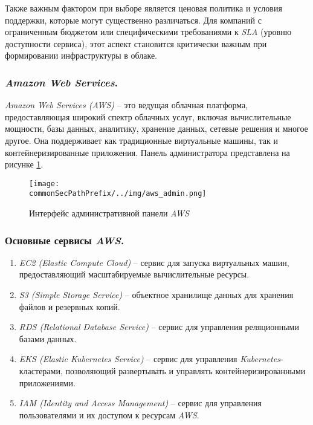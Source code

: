 Также важным фактором при выборе является ценовая политика и условия поддержки, которые могут существенно различаться. Для компаний с ограниченным бюджетом или специфическими требованиями к \textit{SLA} (уровню доступности сервиса), этот аспект становится критически важным при формировании инфраструктуры в облаке.

\subsubsection{\textit{Amazon Web Services}.}
\label{sec:aws}
\textit{Amazon Web Services (AWS)} -- это ведущая облачная платформа, предоставляющая широкий спектр облачных услуг, включая вычислительные мощности, базы данных, аналитику, хранение данных, сетевые решения и многое другое. Она поддерживает как традиционные виртуальные машины, так и контейнеризированные приложения. Панель администратора представлена на рисунке \ref{fig:user_guide:aws_admin}.

\begin{figure}[ht]
    \centering
    \texttt{[image: \\commonSecPathPrefix/../img/aws\_admin.png]}
    \caption{Интерфейс административной панели \textit{AWS}}
    \label{fig:user_guide:aws_admin}
\end{figure}

\subsubsection{Основные сервисы \textit{AWS}.}
\begin{enumerate}
    \item \textit{EC2 (Elastic Compute Cloud)} -- сервис для запуска виртуальных машин, предоставляющий масштабируемые вычислительные ресурсы.
    \item \textit{S3 (Simple Storage Service)} -- объектное хранилище данных для хранения файлов и резервных копий.
    \item \textit{RDS (Relational Database Service)} -- сервис для управления реляционными базами данных.
    \item \textit{EKS (Elastic Kubernetes Service)} -- сервис для управления \textit{Kubernetes}-кластерами, позволяющий развертывать и управлять контейнеризированными приложениями.
    \item \textit{IAM (Identity and Access Management)} -- сервис для управления пользователями и их доступом к ресурсам \textit{AWS}.
\end{enumerate}

